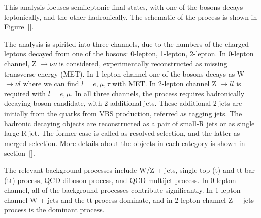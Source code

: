 
This analysis focuses semileptonic final states, with one of the bosons decays leptonically, and the other hadronically. 
The schematic of the process is shown in Figure~\ref{}.



The analysis is spirited into three channels, due to the numbers of the charged leptons decayed from one of the bosons: 0-lepton, 1-lepton, 2-lepton. 
In 0-lepton channel, Z $\rightarrow \nu \nu$ is considered, experimentally reconstructed as missing transverse energy (MET). In 1-lepton channel one of the bosons decays as W $\rightarrow \nu l$ where we can find $l = e, \mu, \tau$ with MET. In 2-lepton channel Z $\rightarrow l l$ is required with $l = e, \mu$. 
In all three channels, the process requires hadronically decaying boson candidate, with 2 additional jets. These additional 2 jets are initially from the quarks from VBS production, referred as tagging jets. The hadronic decaying objects are reconstructed as a pair of small-R jets or as single large-R jet. The former case is called as resolved selection, and the latter as merged selection. More details about the objects in each category is shown in section~\ref{}.

The relevant background processes include W/Z + jets, single top (t) and tt-bar (t$\bar{\mathrm{t}}$) process, QCD diboson process, and QCD multijet process.
In 0-lepton channel, all of the background processes contribute significantly. In 1-lepton channel W + jets and the t$\bar{\mathrm{t}}$ process dominate, and in 2-lepton channel Z + jets process is the dominant process.

